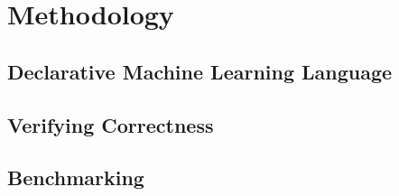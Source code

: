 \chapter{Methodology }

\section{Declarative Machine Learning Language}
\section{Verifying Correctness}
\section{Benchmarking}



















